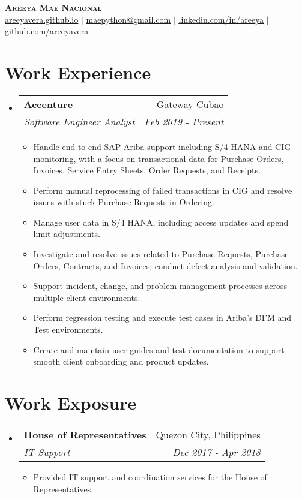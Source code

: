 \documentclass[letterpaper,11pt]{article}
\makeatletter
\newcommand{\resumeItem}[1]{
  \item\small{
    {#1 \vspace{-2pt}}
  }
}
\newcommand{\resumeSubheading}[4]{
  \vspace{-2pt}\item
    \begin{tabular*}{0.97\textwidth}[t]{l@{\extracolsep{\fill}}r}
      \textbf{#1} & #2 \\
      \textit{\small#3} & \textit{\small #4} \\
    \end{tabular*}\vspace{-7pt}
}
\newcommand{\resumeSubHeadingListStart}{\begin{itemize}[leftmargin=0.15in, label={}]}
\newcommand{\resumeSubHeadingListEnd}{\end{itemize}}
\newcommand{\resumeItemListStart}{\begin{itemize}}
\newcommand{\resumeItemListEnd}{\end{itemize}\vspace{-5pt}}
\makeatother
\begin{document}
\begin{center}
    \textbf{\Huge \scshape Areeya Mae Nacional} \\ \vspace{1pt}
    \href{https://areeyavera.github.io}{\underline{areeyavera.github.io}} $|$ \href{mailto:maepython@gmail.com}{\underline{maepython@gmail.com}} $|$ 
    \href{https://www.linkedin.com/in/areeya-mae-nacional-492592195/}{\underline{linkedin.com/in/areeya}} $|$
    \href{https://github.com/areeyavera}{\underline{github.com/areeyavera}}
\end{center}

\section{Work Experience}
  \resumeSubHeadingListStart
    \resumeSubheading
      {Accenture}{Gateway Cubao}
      {Software Engineer Analyst}{Feb 2019 - Present}
      \resumeItemListStart
        \resumeItem{Handle end-to-end SAP Ariba support including S/4 HANA and CIG monitoring, with a focus on transactional data for Purchase Orders, Invoices, Service Entry Sheets, Order Requests, and Receipts.}
        \resumeItem{Perform manual reprocessing of failed transactions in CIG and resolve issues with stuck Purchase Requests in Ordering.}
        \resumeItem{Manage user data in S/4 HANA, including access updates and spend limit adjustments.}
        \resumeItem{Investigate and resolve issues related to Purchase Requests, Purchase Orders, Contracts, and Invoices; conduct defect analysis and validation.}
        \resumeItem{Support incident, change, and problem management processes across multiple client environments.}
        \resumeItem{Perform regression testing and execute test cases in Ariba's DFM and Test environments.}
        \resumeItem{Create and maintain user guides and test documentation to support smooth client onboarding and product updates.}
      \resumeItemListEnd
  \resumeSubHeadingListEnd

\section{Work Exposure}
  \resumeSubHeadingListStart
    \resumeSubheading
      {House of Representatives}{Quezon City, Philippines}
      {IT Support}{Dec 2017 - Apr 2018}
      \resumeItemListStart
        \resumeItem{Provided IT support and coordination services for the House of Representatives.}
      \resumeItemListEnd
  \resumeSubHeadingListEnd
\end{document}
